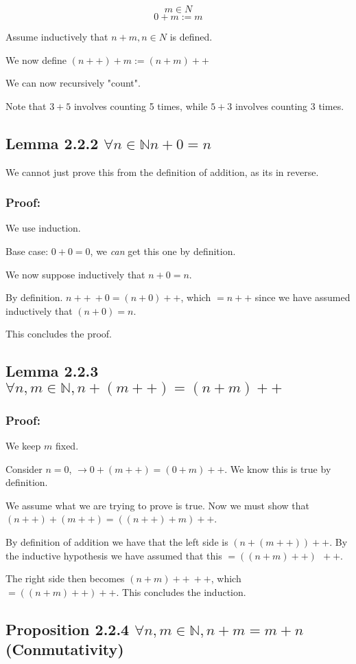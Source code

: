 \documentclass[letterpaper]{article}
\begin{document}
$$m \in N$$
$$0 + m := m$$

Assume inductively that $n+m, n \in N$ is defined. 

\begin{center}
	We now define $(n++) + m := (n+m)++$
	
	We can now recursively "count".
\end{center}

Note that $3+5$ involves counting 5 times, while $5+3$ involves counting 3 times.

\subsection*{Lemma 2.2.2 $\forall n \in \mathbb{N} n+0=n$}
We cannot just prove this from the definition of addition, as its in reverse.

\subsubsection*{Proof:}
We use induction.

Base case: $0+0=0$, we \textit{can} get this one by definition.

We now suppose inductively that $n+0=n$.

By definition. $n++~+0=(n+0)++$, which $=n++$ since we have assumed inductively that $(n+0)=n$.

This concludes the proof.


\subsection*{Lemma 2.2.3 $\forall n,m \in \mathbb{N}, n+(m++)=(n+m)++$}
\subsubsection*{Proof:}
We keep $m$ fixed. 

Consider $n=0$, $\to 0+(m++)=(0+m)++$. We know this is true by definition.

We assume what we are trying to prove is true.
Now we must show that $(n++)+(m++)=((n++)+m)++$.

By definition of addition we have that the left side is $(n+(m++))++$.
By the inductive hypothesis we have assumed that this $=((n+m)++)~~++$.

The right side then becomes $(n+m)++~++$, which $=((n+m)++)++$.
This concludes the induction.

\subsection*{Proposition 2.2.4 $\forall n, m \in \mathbb{N}, n+m = m+n$ (Conmutativity) }
\end{document}
